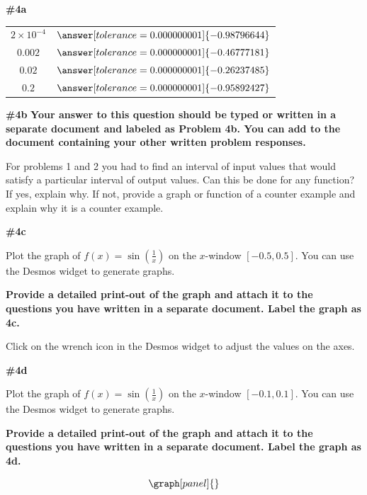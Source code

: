 \documentclass[handout,nooutcomes]{ximera}
\begin{document}
\begin{problem}
\begin{problem}{\textbf{\#4a}}
\begin{tabular}{|c|c|}
		$2\times10^{-4}$ & $\answer[tolerance=0.000000001]{-0.98796644}$ \\
		
		$0.002$ & $\answer[tolerance=0.000000001]{-0.46777181}$ \\
		
		$0.02$ & $\answer[tolerance=0.000000001]{-0.26237485}$ \\
		
		$0.2$ & $\answer[tolerance=0.000000001]{-0.95892427}$ \\
		
\end{tabular}
\end{problem}

\begin{problem}{\textbf{\#4b}}
\textbf{Your answer to this question should be typed or written in a separate document and labeled as Problem 4b. You can add to the document containing your other written problem responses.}

   For problems 1 and 2 you had to find an interval of input values that would satisfy a particular interval of output values. Can this be done for any function? If yes, explain why. If not, provide a graph or function of a counter example and explain why it is a counter example.
\end{problem}

\begin{problem}{\textbf{\#4c}}

Plot the graph of $f(x)=\sin\left(\frac{1}{x}\right)$ on the $x$-window $[-0.5,0.5]$. You can use the Desmos widget to generate graphs. 

\textbf{Provide a detailed print-out of the graph and attach it to the questions you have written in a separate document. Label the graph as 4c.}

\begin{hint}
Click on the wrench icon in the Desmos widget to adjust the values on the axes.
\end{hint}


\end{problem}

\begin{problem}{\textbf{\#4d}}

Plot the graph of $f(x)=\sin\left(\frac{1}{x}\right)$ on the $x$-window $[-0.1,0.1]$. You can use the Desmos widget to generate graphs. 

\textbf{Provide a detailed print-out of the graph and attach it to the questions you have written in a separate document. Label the graph as 4d.}

\end{problem}

\[
\graph[panel]{}
\]

\end{problem}
\end{document}
